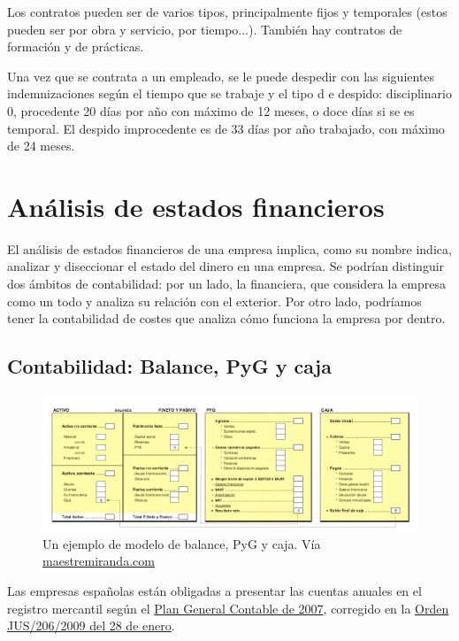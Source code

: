 \documentclass[nochap,palatino,notitlepage]{apuntes}
\begin{document}
Los contratos pueden ser de varios tipos, principalmente fijos y temporales (estos pueden ser por obra y servicio, por tiempo...). También hay contratos de formación y de prácticas.

Una vez que se contrata a un empleado, se le puede despedir con las siguientes indemnizaciones según el tiempo que se trabaje y el tipo d e despido: disciplinario 0, procedente 20 días por año con máximo de 12 meses, o doce días si se es temporal. El despido improcedente es de 33 días por año trabajado, con máximo de 24 meses. %

\section{Análisis de estados financieros}

El análisis de estados financieros de una empresa implica, como su nombre indica, analizar y diseccionar el estado del dinero en una empresa. Se podrían distinguir dos ámbitos de contabilidad: por un lado, la financiera, que considera la empresa como un todo y analiza su relación con el exterior. Por otro lado, podríamos tener la contabilidad de costes que analiza cómo funciona la empresa por dentro.

\subsection{Contabilidad: Balance, PyG y caja}
\label{sec:Contabilidad}

\begin{figure}[hbtp]
\centering
\includegraphics[width=\textwidth]{img/Balance_PyG_Caja.png}
\caption{Un ejemplo de modelo de balance, PyG y caja. Vía \href{http://maestremiranda.com/techdir/wp-content/uploads/2015/10/EF0.-Bal_PYG_Caja.pdf}{maestremiranda.com}}
\label{fig:BalancePyGCaja}
\end{figure}

Las empresas españolas están obligadas a presentar las cuentas anuales en el registro mercantil según el \href{https://www.boe.es/buscar/doc.php?id=BOE-A-2007-13023}{Plan General Contable de 2007}, corregido en la \href{https://www.boe.es/boe/dias/2009/02/10/pdfs/BOE-A-2009-2276.pdf}{Orden JUS/206/2009 del 28 de enero}.
\end{document}
